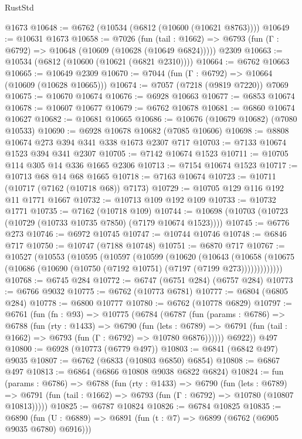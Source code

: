 \begin{lexlean}{RustStd}
\begin{coremodule}
    @1673
@10648 := @6762 (@10534 (@6812 (@10600 (@10621 @8763))))
@10649 := @10631 @1673
@10658 := @7026
    (fun (tail : @1662) => @6793 (fun (Γ : @6792) => @10648 (@10609 (@10628 (@10649 @6824)))))
    @2309
@10663 := @10534 (@6812 (@10600 (@10621 (@6821 @2310))))
@10664 := @6762 @10663
@10665 := @10649 @2309
@10670 := @7044 (fun (Γ : @6792) => @10664 (@10609 (@10628 @10665)))
@10674 := @7057 (@7218 (@9819 @7220)) @7069
@10675 := @10670 @10674
@10676 := @6928 @10663
@10677 := @6853 @10674
@10678 := @10607 @10677
@10679 := @6762 @10678
@10681 := @6860 @10674 @10627
@10682 := @10681 @10665
@10686 := @10676 (@10679 @10682) (@7080 @10533)
@10690 := @6928 @10678 @10682 (@7085 @10606)
@10698 := @8808 @10674 @273 @394 @341 @338 @1673 @2307 @717
@10703 := @7133 @10674 @1523 @394 @341 @2307
@10705 := @7142 @10674 @1523
@10711 := @10705 @114 @305 @14 @336 @1665 @2306
@10713 := @7154 @10674 @1523
@10717 := @10713 @68 @14 @68 @1665
@10718 := @7163 @10674
@10723 := @10711 (@10717 (@7162 (@10718 @68)) @7173)
@10729 := @10705 @129 @116 @192 @11 @1771 @1667
@10732 := @10713 @109 @192 @109
@10733 := @10732 @1771
@10735 := @7162 (@10718 @109)
@10744 := @10698 (@10703 (@10723 (@10729 (@10733 @10735 @7850) (@7179 @10674 @1523))))
@10745 := @6776 @273
@10746 := @6972 @10745
@10747 := @10744 @10746
@10748 := @6846 @717
@10750 := @10747 (@7188 @10748)
@10751 := @6870 @717
@10767 := @10527
    (@10553
      (@10595
        (@10597
          (@10599
            (@10620
              (@10643
                (@10658
                  (@10675 (@10686 (@10690 (@10750 (@7192 @10751) (@7197 (@7199 @273)))))))))))))
@10768 := @6745 @284
@10772 := @6747 (@6751 @284) (@6757 @284)
@10773 := @6766 @9032
@10775 := @6762 (@10773 @6781)
@10777 := @6804 (@6805 @284)
@10778 := @6800 @10777
@10780 := @6762 (@10778 @6829)
@10797 := @6761
    (fun (fn : @93) =>
    @10775
      (@6784
        (@6787
          (fun (params : @6786) =>
          @6788
            (fun (rty : @1433) =>
            @6790
              (fun (lets : @6789) =>
              @6791 (fun (tail : @1662) => @6793 (fun (Γ : @6792) => @10780 @6876))))))
        @6922))
    @497
@10800 := @6928 (@10773 (@6779 @497))
@10803 := @6841 (@6842 @497) @9035
@10807 := @6762 (@6833 (@10803 @6850) @6854)
@10808 := @6867 @497
@10813 := @6864 (@6866 @10808 @9038 @6822 @6824)
@10824 := fun (params : @6786) =>
  @6788
    (fun (rty : @1433) =>
    @6790
      (fun (lets : @6789) =>
      @6791 (fun (tail : @1662) => @6793 (fun (Γ : @6792) => @10780 (@10807 @10813)))))
@10825 := @6787 @10824
@10826 := @6784 @10825
@10835 := @6890 (fun (U : @6889) => @6891 (fun (t : @7) => @6899 (@6762 (@6905 @9035 @6780) @6916)))

\end{coremodule}
\end{lexlean}
